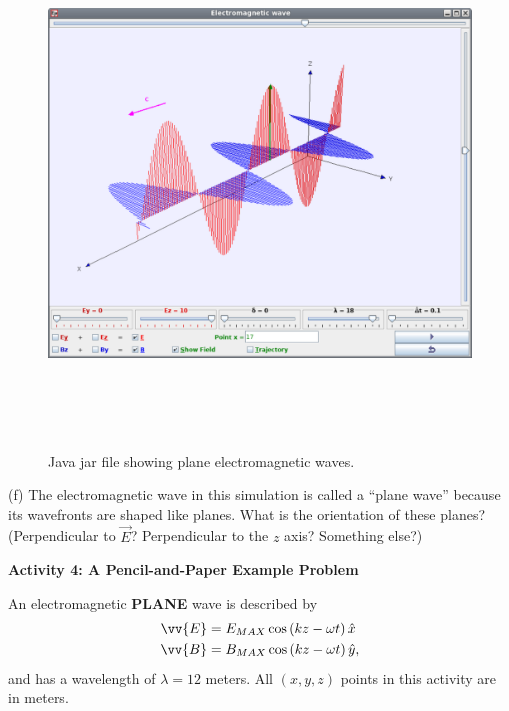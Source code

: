 \begin{figure}[h!]
\begin{center}
\includegraphics[height=5.50in]{plane_waves/planeWave1.pdf}
\caption{Java jar file showing plane electromagnetic waves.}
\end{center}
\end{figure}

(f) The electromagnetic wave in this simulation is called a ``plane wave'' because its 
wavefronts are shaped like planes.  
What is the orientation of these planes?  
(Perpendicular to $\vec {E}$?  Perpendicular to the $z$ axis? Something else?)
\answerspace{20mm}

\pagebreak[2]


\textbf{Activity 4: A Pencil-and-Paper Example Problem}

An electromagnetic \textbf{PLANE} wave is described by
\begin{align*}
\vv {E} &= E_{MAX} \cos \left ( kz - \omega t \right ) \hat x\\
\vv {B} &= B_{MAX} \cos \left ( kz - \omega t \right ) \hat y,
\end{align*}
and has a wavelength of $\lambda =12$ meters.  All $(x,y,z)$ points in this activity are in meters.

